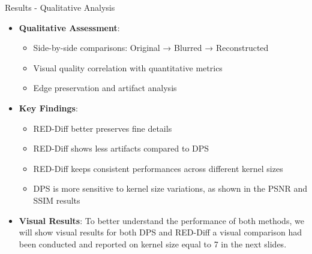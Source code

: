\begin{frame}{Results - Qualitative Analysis}
\begin{itemize}
    \item \textbf{Qualitative Assessment}:
          \begin{itemize}
              \item Side-by-side comparisons: Original → Blurred → Reconstructed
              \item Visual quality correlation with quantitative metrics
              \item Edge preservation and artifact analysis
          \end{itemize}
    \item \textbf{Key Findings}:
          \begin{itemize}
              \item RED-Diff better preserves fine details
              \item RED-Diff shows less artifacts compared to DPS
              \item RED-Diff keeps consistent performances across different kernel sizes
              \item DPS is more sensitive to kernel size variations, as shown in the PSNR and SSIM results
          \end{itemize}

    \item \textbf{Visual Results}: To better understand the performance of both methods, we will show visual results for both DPS and RED-Diff a visual comparison had been conducted and reported on kernel size equal to 7 in the next slides.
\end{itemize}
\end{frame}

